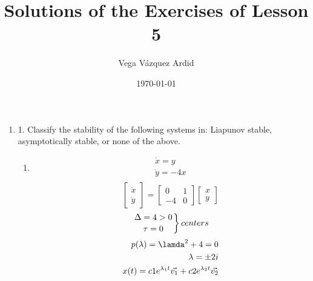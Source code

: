 \documentclass[a4paper,10pt]{article}
\title{Solutions of the Exercises of Lesson 5}
\author{Vega Vázquez Ardid}
\date{\today}
\begin{document}
\maketitle

\begin{enumerate}
    \item 1. Classify the stability of the following systems in: Liapunov stable, asymptotically stable, or none of the above.
        \begin{enumerate}
            \item
                \begin{equation}
                    \begin{aligned}
                        \Dot{x}=y\\
                        \Dot{y}=-4x\\
                    \end{aligned}
                \end{equation}
                \begin{equation}
                    \begin{bmatrix}
                        \dot{x}\\
                        \dot{y}
                    \end{bmatrix}
                    =
                    \begin{bmatrix}
                        0 & 1\\
                        -4 & 0
                    \end{bmatrix}
                    \begin{bmatrix}
                        x\\
                        y
                    \end{bmatrix}
                \end{equation}
                \begin{equation}
                    \left.
                    \Delta = 4 > 0 \atop
                    \tau=0
                    \right\}{centers}
                \end{equation}
                \begin{equation}
                    \begin{aligned}
                        p(\lambda)= \lamda^{2} + 4=0\\
                        \lambda= \pm2i\\
                        x(t)= c1e^{\lambda_{1}t}\vec{v_{1}} + c2e^{\lambda_{2}t}\vec{v_{2}}\\

\end{aligned}
\end{equation}
\end{enumerate}
\end{enumerate}
\end{document}
